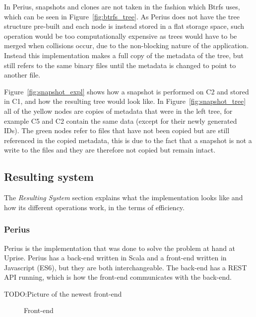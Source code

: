 \documentclass[a4paper,12pt]{article}
\newcommand{\fix}{\colorbox{yellow!30}{TODO:}}
\begin{document}
In Perius, snapshots and clones are not taken in the fashion which Btrfs uses, which can be seen in
Figure~\ref{fig:btrfs_tree}. As Perius does not have the tree structure pre-built and each node is
instead stored in a flat storage space, such operation would be too computationally expensive as
trees would have to be merged when collisions occur, due to the non-blocking nature of the
application. Instead this implementation makes a full copy of the metadata of the tree, but still
refers to the same binary files until the metadata is changed to point to another file.

Figure~\ref{fig:snapshot_expl} shows how a snapshot is performed on C2 and stored in C1, and how the
resulting tree would look like. In Figure~\ref{fig:snapshot_tree} all of the yellow nodes are copies
of metadata that were in the left tree, for example C5 and C2 contain the same data (except for
their newly generated IDs). The green nodes refer to files that have not been copied but are still
referenced in the copied metadata, this is due to the fact that a snapshot is not a write to the
files and they are therefore not copied but remain intact.

\subsection{Resulting system}
The \textit{Resulting System} section explains what the implementation looks like and how its
different operations work, in the terms of efficiency. 

\subsubsection{Perius}
Perius is the implementation that was done to solve the problem at hand at Uprise. Perius has a
back-end written in Scala and a front-end written in Javascript (ES6), but they are both
interchangeable. The back-end has a REST API running, which is how the front-end communicates with
the back-end.

\fix Picture of the newest front-end
\begin{figure}[H] 
    \caption{Front-end~\cite{BTRFS}}
    \label{fig:frontend}
\end{figure}
\end{document}
